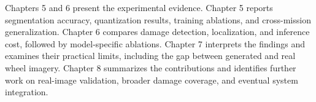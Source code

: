 Chapters 5 and 6 present the experimental evidence. Chapter 5 reports segmentation accuracy, quantization results, training ablations, and cross-mission generalization. Chapter 6 compares damage detection, localization, and inference cost, followed by model-specific ablations. Chapter 7 interprets the findings and examines their practical limits, including the gap between generated and real wheel imagery. Chapter 8 summarizes the contributions and identifies further work on real-image validation, broader damage coverage, and eventual system integration.

